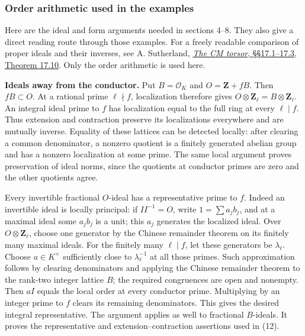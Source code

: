 \documentclass[11pt,a4paper]{article}
\begin{document}
\subsubsection{Order arithmetic used in the
examples}\label{order-arithmetic-used-in-the-examples}

Here are the ideal and form arguments needed in sections 4--8. They also
give a direct reading route through those examples. For a freely
readable comparison of proper ideals and their inverses, see A.
Sutherland,
\href{https://math.mit.edu/classes/18.783/2023/LectureNotes17.pdf}{\emph{The
CM torsor}, §§17.1--17.3, Theorem 17.10}. Only the order arithmetic is
used here.

\textbf{Ideals away from the conductor.} Put \(B=\mathcal O_K\) and
\(O=\mathbf Z+fB\). Then \(fB\subset O\). At a rational prime
\(\ell\nmid f\), localization therefore gives
\(O\otimes\mathbf Z_\ell=B\otimes\mathbf Z_\ell\). An integral ideal
prime to \(f\) has localization equal to the full ring at every
\(\ell\mid f\). Thus extension and contraction preserve its
localizations everywhere and are mutually inverse. Equality of these
lattices can be detected locally: after clearing a common denominator, a
nonzero quotient is a finitely generated abelian group and has a nonzero
localization at some prime. The same local argument proves preservation
of ideal norms, since the quotients at conductor primes are zero and the
other quotients agree.

Every invertible fractional \(O\)-ideal has a representative prime to
\(f\). Indeed an invertible ideal is locally principal: if
\(II^{-1}=O\), write \(1=\sum a_jb_j\), and at a maximal ideal some
\(a_jb_j\) is a unit; this \(a_j\) generates the localized ideal. Over
\(O\otimes\mathbf Z_\ell\), choose one generator by the Chinese
remainder theorem on its finitely many maximal ideals. For the finitely
many \(\ell\mid f\), let these generators be \(\lambda_\ell\). Choose
\(a\in K^\times\) sufficiently close to \(\lambda_\ell^{-1}\) at all
those primes. Such approximation follows by clearing denominators and
applying the Chinese remainder theorem to the rank-two integer lattice
\(B\); the required congruences are open and nonempty. Then \(aI\)
equals the local order at every conductor prime. Multiplying by an
integer prime to \(f\) clears its remaining denominators. This gives the
desired integral representative. The argument applies as well to
fractional \(B\)-ideals. It proves the representative and
extension--contraction assertions used in (12).
\end{document}
